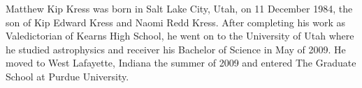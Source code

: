 %
%
%
%

\begin{vita}

Matthew Kip Kress was born in Salt Lake City, Utah, on 11 December 1984, the son of Kip Edward Kress and Naomi Redd Kress.  After completing his work as Valedictorian of Kearns High School, he went on to the University of Utah where he studied astrophysics and receiver his Bachelor of Science in May of 2009.  He moved to West Lafayette, Indiana the summer of 2009 and entered The Graduate School at Purdue University.
\end{vita}
